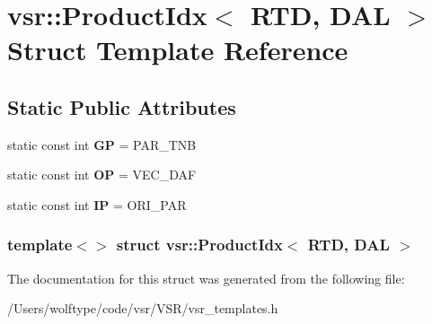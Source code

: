 \hypertarget{structvsr_1_1_product_idx_3_01_r_t_d_00_01_d_a_l_01_4}{\section{vsr\-:\-:Product\-Idx$<$ R\-T\-D, D\-A\-L $>$ Struct Template Reference}
\label{structvsr_1_1_product_idx_3_01_r_t_d_00_01_d_a_l_01_4}
}
\subsection*{Static Public Attributes}
\begin{DoxyCompactItemize}
\item 
\hypertarget{structvsr_1_1_product_idx_3_01_r_t_d_00_01_d_a_l_01_4_a04dca97d44e482a734c3439c6b3a0611}{static const int {\bfseries G\-P} = P\-A\-R\-\_\-\-T\-N\-B}\label{structvsr_1_1_product_idx_3_01_r_t_d_00_01_d_a_l_01_4_a04dca97d44e482a734c3439c6b3a0611}

\item 
\hypertarget{structvsr_1_1_product_idx_3_01_r_t_d_00_01_d_a_l_01_4_aef06dc43b1d84085db94a3367d065a00}{static const int {\bfseries O\-P} = V\-E\-C\-\_\-\-D\-A\-F}\label{structvsr_1_1_product_idx_3_01_r_t_d_00_01_d_a_l_01_4_aef06dc43b1d84085db94a3367d065a00}

\item 
\hypertarget{structvsr_1_1_product_idx_3_01_r_t_d_00_01_d_a_l_01_4_acc76e96614c41871351e9371a5ecfa17}{static const int {\bfseries I\-P} = O\-R\-I\-\_\-\-P\-A\-R}\label{structvsr_1_1_product_idx_3_01_r_t_d_00_01_d_a_l_01_4_acc76e96614c41871351e9371a5ecfa17}

\end{DoxyCompactItemize}
\subsubsection*{template$<$$>$ struct vsr\-::\-Product\-Idx$<$ R\-T\-D, D\-A\-L $>$}



The documentation for this struct was generated from the following file\-:\begin{DoxyCompactItemize}
\item 
/\-Users/wolftype/code/vsr/\-V\-S\-R/vsr\-\_\-templates.\-h\end{DoxyCompactItemize}
